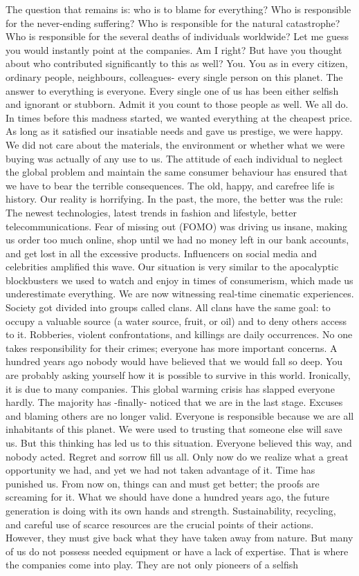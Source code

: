 \documentclass[]{book}
\begin{document}
The question that remains is: who is to blame for everything? Who is responsible for the never-ending suffering? Who is responsible for the natural catastrophe? Who is responsible for the several deaths of individuals worldwide? Let me guess you would instantly point at the companies. Am I right? But have you thought about who contributed significantly to this as well? You. You as in every citizen, ordinary people, neighbours, colleagues- every single person on this planet. The answer to everything is everyone. Every single one of us has been either selfish and ignorant or stubborn. Admit it you count to those people as well. We all do. In times before this madness started, we wanted everything at the cheapest price. As long as it satisfied our insatiable needs and gave us prestige, we were happy. We did not care about the materials, the environment or whether what we were buying was actually of any use to us. The attitude of each individual to neglect the global problem and maintain the same consumer behaviour has ensured that we have to bear the terrible consequences. The old, happy, and carefree life is history. Our reality is horrifying. In the past, the more, the better was the rule: The newest technologies, latest trends in fashion and lifestyle, better telecommunications. Fear of missing out (FOMO) was driving us insane, making us order too much online, shop until we had no money left in our bank accounts, and get lost in all the excessive products. Influencers on social media and celebrities amplified this wave. Our situation is very similar to the apocalyptic blockbusters we used to watch and enjoy in times of consumerism, which made us underestimate everything. We are now witnessing real-time cinematic experiences. Society got divided into groups called clans. All clans have the same goal: to occupy a valuable source (a water source, fruit, or oil) and to deny others access to it. Robberies, violent confrontations, and killings are daily occurrences. No one takes responsibility for their crimes; everyone has more important concerns. A hundred years ago nobody would have believed that we would fall so deep. You are probably asking yourself how it is possible to survive in this world. Ironically, it is due to many companies. This global warming crisis has slapped everyone hardly. The majority has -finally- noticed that we are in the last stage. Excuses and blaming others are no longer valid. Everyone is responsible because we are all inhabitants of this planet. We were used to trusting that someone else will save us. But this thinking has led us to this situation. Everyone believed this way, and nobody acted. Regret and sorrow fill us all. Only now do we realize what a great opportunity we had, and yet we had not taken advantage of it. Time has punished us. From now on, things can and must get better; the proofs are screaming for it. What we should have done a hundred years ago, the future generation is doing with its own hands and strength. Sustainability, recycling, and careful use of scarce resources are the crucial points of their actions. However, they must give back what they have taken away from nature. But many of us do not possess needed equipment or have a lack of expertise. That is where the companies come into play. They are not only pioneers of a selfish 
\end{document}
